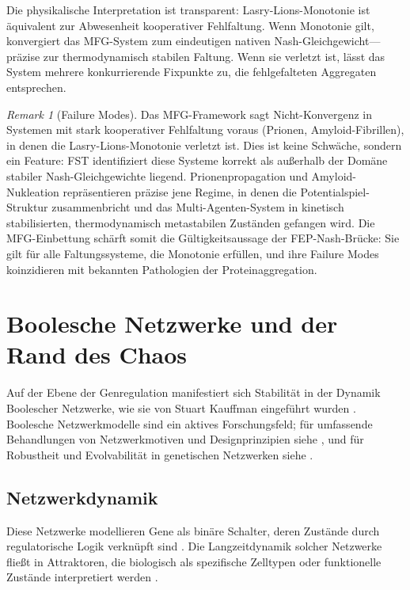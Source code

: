 \documentclass[12pt,a4paper]{article}
\theoremstyle{remark}
\newtheorem{remark}{Remark}
\begin{document}
Die physikalische Interpretation ist transparent: Lasry-Lions-Monotonie ist \"aquivalent zur Abwesenheit kooperativer Fehlfaltung. Wenn Monotonie gilt, konvergiert das MFG-System zum eindeutigen nativen Nash-Gleichgewicht---pr\"azise zur thermodynamisch stabilen Faltung. Wenn sie verletzt ist, l\"asst das System mehrere konkurrierende Fixpunkte zu, die fehlgefalteten Aggregaten entsprechen.

\begin{remark}[Failure Modes]\label{rem:mfg-failure}
Das MFG-Framework sagt Nicht-Konvergenz in Systemen mit stark kooperativer Fehlfaltung voraus (Prionen, Amyloid-Fibrillen), in denen die Lasry-Lions-Monotonie verletzt ist. Dies ist keine Schw\"ache, sondern ein Feature: FST identifiziert diese Systeme korrekt als au\ss{}erhalb der Dom\"ane stabiler Nash-Gleichgewichte liegend. Prionenpropagation und Amyloid-Nukleation repr\"asentieren pr\"azise jene Regime, in denen die Potentialspiel-Struktur zusammenbricht und das Multi-Agenten-System in kinetisch stabilisierten, thermodynamisch metastabilen Zust\"anden gefangen wird. Die MFG-Einbettung sch\"arft somit die G\"ultigkeitsaussage der FEP-Nash-Br\"ucke: Sie gilt f\"ur alle Faltungssysteme, die Monotonie erf\"ullen, und ihre Failure Modes koinzidieren mit bekannten Pathologien der Proteinaggregation.
\end{remark}

\section{Boolesche Netzwerke und der Rand des Chaos}
\label{sec:boolean}

Auf der Ebene der Genregulation manifestiert sich Stabilit\"at in der Dynamik Boolescher Netzwerke, wie sie von Stuart Kauffman eingef\"uhrt wurden \citep{BooleanPost,KauffmanOrigins}. Boolesche Netzwerkmodelle sind ein aktives Forschungsfeld; f\"ur umfassende Behandlungen von Netzwerkmotiven und Designprinzipien siehe \citet{AlonSystems2007}, und f\"ur Robustheit und Evolvabilit\"at in genetischen Netzwerken siehe \citet{WagnerRobustness2005}.

\subsection{Netzwerkdynamik}

Diese Netzwerke modellieren Gene als bin\"are Schalter, deren Zust\"ande durch regulatorische Logik verkn\"upft sind \citep{BooleanPost}. Die Langzeitdynamik solcher Netzwerke flie\ss{}t in Attraktoren, die biologisch als spezifische Zelltypen oder funktionelle Zust\"ande interpretiert werden \citep{BooleanEvolution}.
\end{document}

